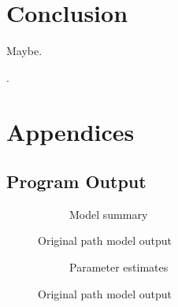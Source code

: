 \documentclass[11pt,a4paper]{article}
\begin{document}
\section{Conclusion}\label{sec:conclusion}
Maybe.

\clearpage

\appendix

\renewcommand{\refname}{\section{References}}.


\clearpage

\section{Appendices}


\subsection{Program Output}\label{sec:program_output}

\pagestyle{empty}

\begin{figure}[htbp]
\begin{subfigure}{\textwidth}

\caption{Model summary}
\end{subfigure}
\caption{Original path model output}
\label{fig:orig_model_output}
\end{figure}

\begin{figure}[htbp]\ContinuedFloat
\begin{subfigure}{\textwidth}

\caption{Parameter estimates}
\end{subfigure}
\caption{Original path model output}
\end{figure}

\restoregeometry{}
\end{document}

